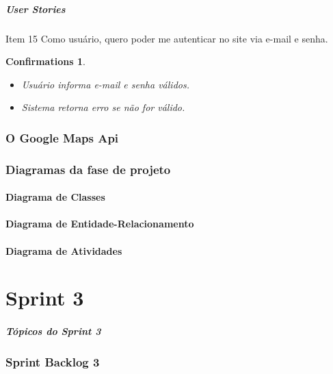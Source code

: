 \documentclass[12pt,a4paper]{beamer}
\newtheorem{confirmations}[theorem]{Confirmations}
\begin{document}
			\begin{frame}
				\frametitle{User Stories}	
				\begin{block}{Item 15}
					Como usuário, quero poder me autenticar no site via e-mail e senha.
					
					\begin{confirmations}
						\begin{itemize}
							\item Usuário informa e-mail e senha válidos.
							\item Sistema retorna erro se não for válido.
						\end{itemize}
					\end{confirmations}
				\end{block}
			\end{frame}			
			
			
				
		\section{O Google Maps Api}
		\section{Diagramas da fase de projeto}
			\subsection{Diagrama de Classes}
			\subsection{Diagrama de Entidade-Relacionamento}
			\subsection{Diagrama de Atividades}
			
			
	\part{Sprint 3}
	
		\begin{frame}
			\frametitle{Tópicos do Sprint 3}
			\tableofcontents[pausesections]
		\end{frame}	
	
		\section{Sprint Backlog 3}
\end{document}
